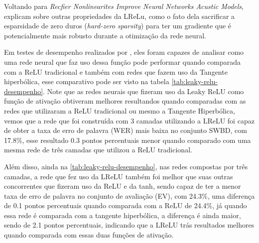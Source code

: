 Voltando para \textit{Recfier Nonlinearites Improve Neural Networks Acustic Models}, \textcite{LeakyReLUArticle} explicam sobre outras propriedades da LReLu, como o fato dela sacrificar a esparsidade de zero duros (\textit{hard-zero sparsity}) para ter um gradiente que é potencialmente mais robusto durante a otimização da rede neural.

Em testes de desempenho realizados por \textcite{LeakyReLUArticle}, eles foram capazes de analisar como uma rede neural que faz uso dessa função pode performar quando comparada com a ReLU tradicional e também com redes que fazem uso da Tangente hiperbólica, esse comparativo pode ser visto na tabela \ref{tab:leaky-relu-desempenho}. Note que as redes neurais que fizeram uso da Leaky ReLU como função de ativação obtiveram melhores resultandos quando comparadas com as redes que utilizaram a ReLU tradicional ou mesmo a Tangente Hiperbólica, vemos que a rede que foi construída com 3 camadas utilizando a LReLU foi capaz de obter a taxa de erro de palavra (WER) mais baixa no conjunto SWBD, com 17.8\%, esse resultado 0.3 pontos percentuais menor quando comparado com uma mesma rede de três camadas que utilizou a ReLU tradicional.

Além disso, ainda na \ref{tab:leaky-relu-desempenho}, nas redes compostas por três camadas, a rede que fez uso da LReLU também foi melhor que suas outras concorrentes que fizeram uso da ReLU e da tanh, sendo capaz de ter a menor taxa de erro de palavra no conjunto de avaliação (EV), com 24.3\%, uma diferença de 0.1 pontos percentuais quando comparada com a ReLU de 24.4\%, já quando essa rede é comparada com a tangente hiperbólica, a diferença é ainda maior, sendo de 2.1 pontos percentuais, indicando que a LReLU trás resultados melhores quando comparada com essas duas funções de ativação.

